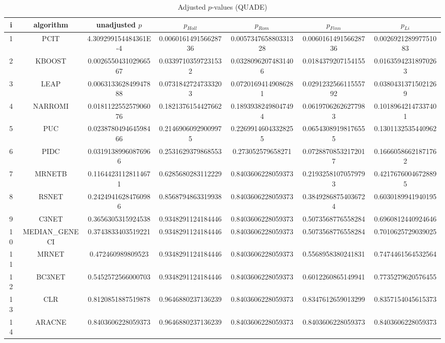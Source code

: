 \documentclass[a4paper,10pt]{article}
\begin{document}
\begin{landscape}
\begin{table}[!htp]
\centering\scriptsize
\caption{Adjusted $p$-values (QUADE)}
\begin{tabular}{ccccccc}
i&algorithm&unadjusted $p$&$p_{Holl}$&$p_{Rom}$&$p_{Finn}$&$p_{Li}$\\
\hline
1&PCIT&4.309299154484361E-4&0.006016149156628736&0.005734765880331328&0.006016149156628736&0.002692128997751083\\
2&KBOOST&0.002655043102966567&0.03397103597231532&0.03280962074831406&0.0184379207154155&0.01635942318970263\\
3&LEAP&0.006313362849947888&0.07318427247333203&0.07201694149086281&0.029123256611555792&0.03804313715021269\\
4&NARROMI&0.018112255257906076&0.1821376154427662&0.18939382498047494&0.06197062626277983&0.10189642147337401\\
5&PUC&0.023878049464598466&0.21469060929009975&0.22699146043328255&0.06543089198176555&0.1301132535440962\\
6&PIDC&0.03191389960876966&0.2531629379868553&0.273052579658271&0.07288708532172017&0.16660586621871762\\
7&MRNETB&0.11644231128114671&0.6285680283112229&0.8403606228059373&0.21932581070579793&0.42176760046728895\\
8&RSNET&0.24249416284760986&0.8568794863319938&0.8403606228059373&0.38492868754036724&0.6030189941940195\\
9&C3NET&0.3656305315924538&0.9348291124184446&0.8403606228059373&0.5073568776558284&0.6960812440924646\\
10&MEDIAN_GENECI&0.3743833403519221&0.9348291124184446&0.8403606228059373&0.5073568776558284&0.7010625729039025\\
11&MRNET&0.472460989809523&0.9348291124184446&0.8403606228059373&0.5568958380241831&0.7474461564532564\\
12&BC3NET&0.5452572566000703&0.9348291124184446&0.8403606228059373&0.6012260865149941&0.7735279620576455\\
13&CLR&0.8120851887519878&0.9646880237136239&0.8403606228059373&0.8347612659013299&0.8357154045615373\\
14&ARACNE&0.8403606228059373&0.9646880237136239&0.8403606228059373&0.8403606228059373&0.8403606228059373\\
\hline
\end{tabular}
\end{table}

\end{landscape}
\end{document}
